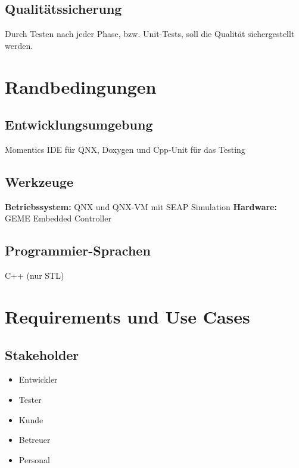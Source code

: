 \documentclass[oneside,a4paper,titlepage]{scrartcl} %
\begin{document}
\subsection{Qualitätssicherung}
Durch Testen nach jeder Phase, bzw. Unit-Tests, soll die Qualität sichergestellt werden.

\newpage

\section{Randbedingungen}

\subsection{Entwicklungsumgebung}
Momentics IDE für QNX, Doxygen und Cpp-Unit für das Testing

\subsection{Werkzeuge}
\textbf{Betriebssystem:} QNX und QNX-VM mit SEAP Simulation\newline
\textbf{Hardware:} GEME Embedded Controller

\subsection{Programmier-Sprachen}
C++ (nur STL)

\section{Requirements und Use Cases}

\subsection{Stakeholder}
\begin{itemize}
    \item Entwickler
    \item Tester
    \item Kunde
    \item Betreuer
    \item Personal
\end{itemize}

\newpage

\end{document}

